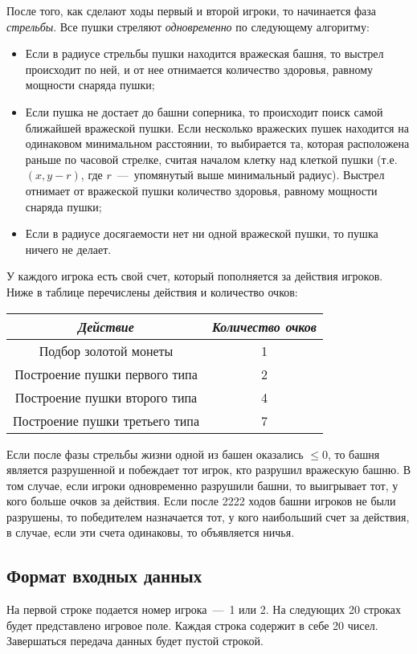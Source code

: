\documentclass[14pt]{extarticle}
\begin{document}
После того, как сделают ходы первый и второй игроки, то начинается фаза \emph{стрельбы}. Все пушки стреляют \emph{одновременно} по следующему алгоритму:
\begin{itemize}
    \item Если в радиусе стрельбы пушки находится вражеская башня, то выстрел происходит по ней, и от нее отнимается количество здоровья, равному мощности снаряда пушки;
    \item Если пушка не достает до башни соперника, то происходит поиск самой ближайшей вражеской пушки. Если несколько вражеских пушек находится на одинаковом минимальном расстоянии, то выбирается та, которая расположена раньше по часовой стрелке, считая началом клетку над клеткой пушки (т.е. $(x, y - r)$, где $r$~---~упомянутый выше минимальный радиус). Выстрел отнимает от вражеской пушки количество здоровья, равному мощности снаряда пушки;
    \item Если в радиусе досягаемости нет ни одной вражеской пушки, то пушка ничего не делает.
\end{itemize}

У каждого игрока есть свой счет, который пополняется за действия игроков. Ниже в таблице перечислены действия и количество очков:
\begin{table}[h]
    \centering
    \begin{tabular}{|c|c|}
        \hline
        \emph{Действие} & \emph{Количество очков} \\
        \hline
        Подбор золотой монеты & 1 \\
        \hline
        Построение пушки первого типа & 2 \\
        \hline
        Построение пушки второго типа & 4 \\
        \hline
        Построение пушки третьего типа & 7 \\
        \hline
    \end{tabular}
\end{table}

Если после фазы стрельбы жизни одной из башен оказались $\leq 0$, то башня является разрушенной и побеждает тот игрок, кто разрушил вражескую башню. В том случае, если игроки одновременно разрушили башни, то выигрывает тот, у кого больше очков за действия. Если после 2222 ходов башни игроков не были разрушены, то победителем назначается тот, у кого наибольший счет за действия, в случае, если эти счета одинаковы, то объявляется ничья.

\subsection*{Формат входных данных}
На первой строке подается номер игрока~---~1 или 2.
На следующих 20 строках будет представлено игровое поле. Каждая строка содержит в себе 20 чисел. Завершаться передача данных будет пустой строкой.
\end{document}
